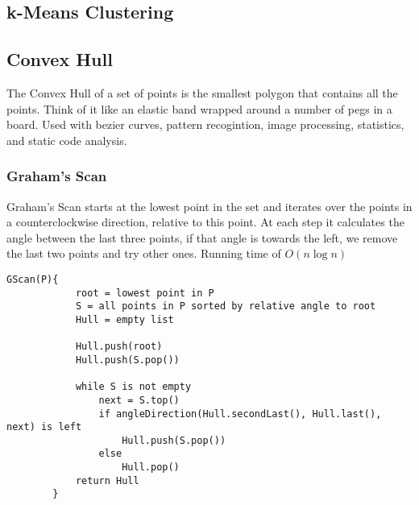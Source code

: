 \documentclass{article}
\begin{document}
	\subsection{k-Means Clustering}

	\subsection{Convex Hull}
	The Convex Hull of a set of points is the smallest polygon that contains all the points. Think of it like an elastic band wrapped around a number of pegs in a board. Used with bezier curves, pattern recogintion, image processing, statistics, and static code analysis.

		\subsubsection{Graham's Scan}
		Graham's Scan starts at the lowest point in the set and iterates over the points in a counterclockwise direction, relative to this point. At each step it calculates the angle between the last three points, if that angle is towards the left, we remove the last two points and try other ones. Running time of $O(n \log n)$

		\begin{lstlisting}[style=pseudo]
		GScan(P){
			root = lowest point in P
			S = all points in P sorted by relative angle to root
			Hull = empty list

			Hull.push(root)
			Hull.push(S.pop())

			while S is not empty
				next = S.top()
				if angleDirection(Hull.secondLast(), Hull.last(), next) is left
					Hull.push(S.pop())
				else
					Hull.pop()
			return Hull
		}
		\end{lstlisting}
\end{document}
